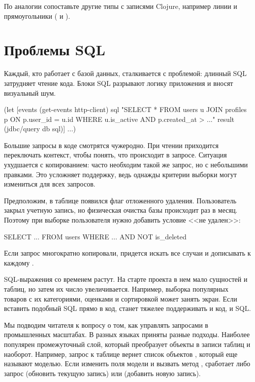 По аналогии сопоставьте другие типы с записями Clojure, например линии и прямоугольники ( и ).

\section{Проблемы SQL}

Каждый, кто работает с базой данных, сталкивается с проблемой: длинный SQL затрудняет чтение кода. Блоки SQL разрывают логику приложения и вносят визуальный шум.

\begin{english}
  \begin{clojure}
(let [events (get-events http-client)
      sql "SELECT * FROM users u
JOIN profiles p ON p.user_id = u.id
WHERE u.is_active
AND p.created_at > ..."
      result (jdbc/query db sql)]
  ...)
  \end{clojure}
\end{english}

Большие запросы в коде смотрятся чужеродно. При чтении приходится переключать контекст, чтобы понять, что происходит в запросе. Ситуация ухудшается с копированием: часто необходим такой же запрос, но с небольшими правками. Это усложняет поддержку, ведь однажды критерии выборки могут измениться для всех запросов.

Предположим, в таблице появился флаг отложенного удаления. Пользователь закрыл учетную запись, но физическая очистка базы происходит раз в месяц. Поэтому при выборке пользователя нужно добавить условие <<не удален>>:

\begin{english}
  \begin{clojure}
SELECT ... FROM users WHERE ... AND NOT is_deleted
  \end{clojure}
\end{english}

Если запрос многократно копировали, придется искать все случаи и дописывать к каждому .

SQL-выражения со временем растут. На старте проекта в нем мало сущностей и таблиц, но затем их число увеличивается. Например, выборка популярных товаров с их категориями, оценками и сортировкой может занять экран. Если вставить подобный SQL прямо в код, станет тяжелее поддерживать и код, и SQL.

Мы подводим читателя к вопросу о том, как управлять запросами в промышленных масштабах. В разных языках приняты разные подходы. Наиболее популярен промежуточный слой, который преобразует объекты в записи таблиц и наоборот. Например, запрос к таблице  вернет список объектов , который еще называют моделью. Если изменить поля модели и вызвать метод , сработает либо запрос  (обновить текущую запись) или  (добавить новую запись).

